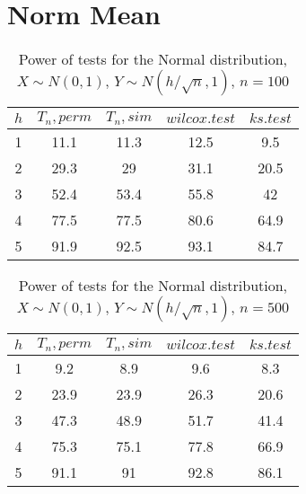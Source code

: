 \documentclass{svproc}
\begin{document}
\newpage

\section*{Norm Mean}

\begin{table}
  \caption{Power of tests for the Normal distribution, $X\sim N(0,1)$, $Y\sim N(h/\sqrt{n},1)$, $n=100$}
  \begin{center}
  \begin{tabular}{c@{\quad}c@{\quad}c@{\quad}c@{\quad}c}
  \hline
  $h$ & $T_n, perm$ & $T_n, sim$ & $wilcox.test$ & $ks.test$ \\
  \hline
  1 & 11.1 & 11.3 & 12.5 & 9.5 \\
  2 & 29.3 & 29 & 31.1 & 20.5 \\
  3 & 52.4 & 53.4 & 55.8 & 42 \\
  4 & 77.5 & 77.5 & 80.6 & 64.9 \\
  5 & 91.9 & 92.5 & 93.1 & 84.7 \\
  \hline
  \end{tabular}
  \end{center}
\end{table}

\begin{table}
  \caption{Power of tests for the Normal distribution, $X\sim N(0,1)$, $Y\sim N(h/\sqrt{n},1)$, $n=500$}
  \begin{center}
  \begin{tabular}{c@{\quad}c@{\quad}c@{\quad}c@{\quad}c}
  \hline
  $h$ & $T_n, perm$ & $T_n, sim$ & $wilcox.test$ & $ks.test$ \\
  \hline
  1 & 9.2 & 8.9 & 9.6 & 8.3 \\
  2 & 23.9 & 23.9 & 26.3 & 20.6 \\
  3 & 47.3 & 48.9 & 51.7 & 41.4 \\
  4 & 75.3 & 75.1 & 77.8 & 66.9 \\
  5 & 91.1 & 91 & 92.8 & 86.1 \\
  \hline
  \end{tabular}
  \end{center}
\end{table}
\end{document}
